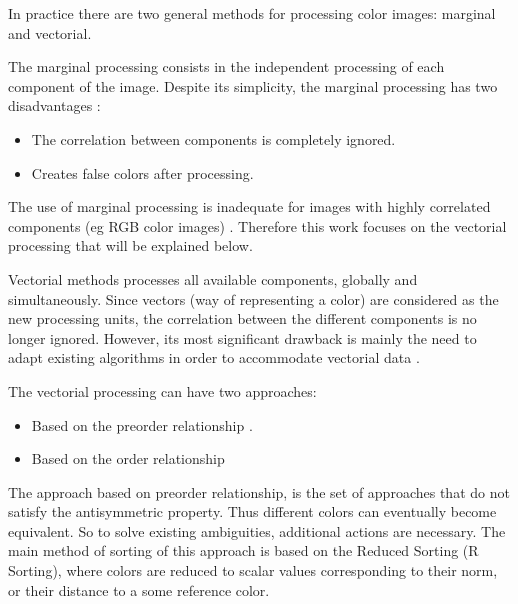 In practice there are two general methods for processing color images: marginal and vectorial.

The marginal processing consists in the independent processing of each component of the image. Despite its simplicity, the marginal processing has two disadvantages \cite{aptoula2007comparative}: 
\begin{itemize}
    \item The correlation between components is completely ignored.
    \item Creates false colors after processing.
\end{itemize}

The use of marginal processing is inadequate for images with highly correlated components (eg RGB color images) \cite{astola1990vector}. Therefore this work focuses on the vectorial processing that will be explained below. 


Vectorial methods processes all available components, globally and simultaneously.
Since vectors (way of representing a color) are considered as the new processing units, the correlation between the different components is no longer ignored. However, its most significant drawback is mainly the need to adapt existing algorithms in order to accommodate vectorial data \cite{aptoula2007comparative}.

The vectorial processing can have two approaches:
 
\begin{itemize}
    \item Based on the preorder relationship .
    \item Based on the order relationship 
\end{itemize}

The approach based on preorder relationship, is the set of approaches that do not satisfy the antisymmetric property.  Thus different colors can eventually become equivalent. So to solve existing ambiguities, additional actions are necessary. The main method of sorting of this approach is based on the Reduced Sorting (R Sorting), where colors are reduced to scalar values corresponding to their norm, or their distance to a some reference color. 

